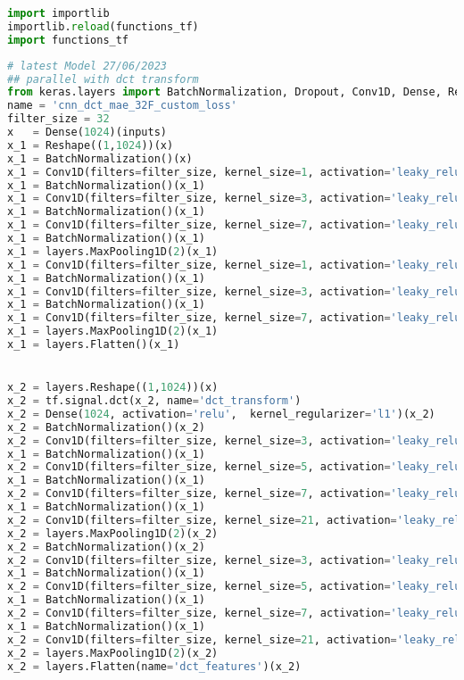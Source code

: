 \begin{lstlisting}[language=Python]
import importlib
importlib.reload(functions_tf)
import functions_tf
\end{lstlisting}

\begin{lstlisting}[language=Python]
# latest Model 27/06/2023
## parallel with dct transform
from keras.layers import BatchNormalization, Dropout, Conv1D, Dense, Reshape
name = 'cnn_dct_mae_32F_custom_loss'
filter_size = 32
x   = Dense(1024)(inputs)
x_1 = Reshape((1,1024))(x)
x_1 = BatchNormalization()(x)
x_1 = Conv1D(filters=filter_size, kernel_size=1, activation='leaky_relu',data_format='channels_first')(x_1)
x_1 = BatchNormalization()(x_1)
x_1 = Conv1D(filters=filter_size, kernel_size=3, activation='leaky_relu',data_format='channels_first')(x_1)
x_1 = BatchNormalization()(x_1)
x_1 = Conv1D(filters=filter_size, kernel_size=7, activation='leaky_relu',data_format='channels_first')(x_1)
x_1 = BatchNormalization()(x_1)
x_1 = layers.MaxPooling1D(2)(x_1)
x_1 = Conv1D(filters=filter_size, kernel_size=1, activation='leaky_relu',data_format='channels_first')(x_1)
x_1 = BatchNormalization()(x_1)
x_1 = Conv1D(filters=filter_size, kernel_size=3, activation='leaky_relu',data_format='channels_first')(x_1)
x_1 = BatchNormalization()(x_1)
x_1 = Conv1D(filters=filter_size, kernel_size=7, activation='leaky_relu',data_format='channels_first')(x_1)
x_1 = layers.MaxPooling1D(2)(x_1)
x_1 = layers.Flatten()(x_1)


x_2 = layers.Reshape((1,1024))(x)
x_2 = tf.signal.dct(x_2, name='dct_transform')
x_2 = Dense(1024, activation='relu',  kernel_regularizer='l1')(x_2)
x_2 = BatchNormalization()(x_2)
x_2 = Conv1D(filters=filter_size, kernel_size=3, activation='leaky_relu',data_format='channels_first')(x_2)
x_1 = BatchNormalization()(x_1)
x_2 = Conv1D(filters=filter_size, kernel_size=5, activation='leaky_relu',data_format='channels_first')(x_2)
x_1 = BatchNormalization()(x_1)
x_2 = Conv1D(filters=filter_size, kernel_size=7, activation='leaky_relu',data_format='channels_first')(x_2)
x_1 = BatchNormalization()(x_1)
x_2 = Conv1D(filters=filter_size, kernel_size=21, activation='leaky_relu',data_format='channels_first')(x_2)
x_2 = layers.MaxPooling1D(2)(x_2)
x_2 = BatchNormalization()(x_2)
x_2 = Conv1D(filters=filter_size, kernel_size=3, activation='leaky_relu',data_format='channels_first')(x_2)
x_1 = BatchNormalization()(x_1)
x_2 = Conv1D(filters=filter_size, kernel_size=5, activation='leaky_relu',data_format='channels_first')(x_2)
x_1 = BatchNormalization()(x_1)
x_2 = Conv1D(filters=filter_size, kernel_size=7, activation='leaky_relu',data_format='channels_first')(x_2)
x_1 = BatchNormalization()(x_1)
x_2 = Conv1D(filters=filter_size, kernel_size=21, activation='leaky_relu',data_format='channels_first')(x_2)
x_2 = layers.MaxPooling1D(2)(x_2)
x_2 = layers.Flatten(name='dct_features')(x_2)


\end{lstlisting}

